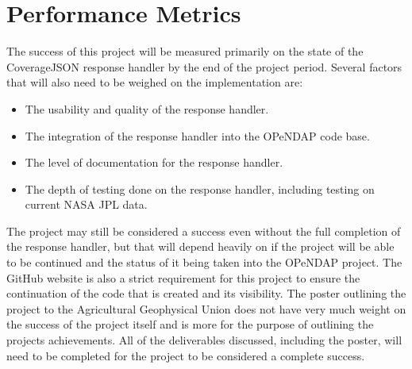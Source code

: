 \documentclass[letterpaper,10pt,draftclsnofoot,onecolumn]{IEEEtran}
\begin{document}
\section{Performance Metrics}
The success of this project will be measured primarily on the state of the CoverageJSON response handler by the end of the project period. Several factors that will also need to be weighed on the implementation are: 
\begin{itemize}
  \item The usability and quality of the response handler.
  \item The integration of the response handler into the OPeNDAP code base.
  \item The level of documentation for the response handler.
  \item The depth of testing done on the response handler, including testing on current NASA JPL data.
\end{itemize} 
The project may still be considered a success even without the full completion of the response handler, but that will depend heavily on if the project will be able to be continued and the status of it being taken into the OPeNDAP project. The GitHub website is also a strict requirement for this project to ensure the continuation of the code that is created and its visibility. The poster outlining the project to the Agricultural Geophysical Union does not have very much weight on the success of the project itself and is more for the purpose of outlining the projects achievements. All of the deliverables discussed, including the poster, will need to be completed for the project to be considered a complete success.
\end{document}
